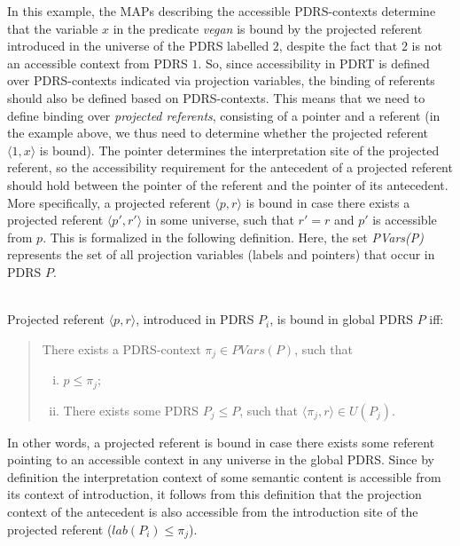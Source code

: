 In this example, the MAPs describing the accessible PDRS-contexts determine
that the variable $x$ in the predicate \textit{vegan} is bound by the
projected referent introduced in the universe of the PDRS labelled $2$,
despite the fact that $2$ is not an accessible context from PDRS $1$.  So,
since accessibility in PDRT is defined over PDRS-contexts indicated via
projection variables, the binding of referents should also be defined based
on PDRS-contexts. This means that we need to define binding over
\textit{projected referents}, consisting of a pointer and a referent (in the
example above, we thus need to determine whether the projected referent
$\langle 1, x\rangle$ is bound). The pointer determines the interpretation
site of the projected referent, so the accessibility requirement for the
antecedent of a projected referent should hold between the pointer of the
referent and the pointer of its antecedent.  More specifically, a projected
referent $\langle p, r \rangle$ is bound in case there exists a projected
referent $\langle p',r'\rangle$ in some universe, such that $r'=r$ and $p'$
is accessible from $p$.  This is formalized in the following definition.
Here, the set \textit{PVars(P)} represents the set of all projection
variables (labels and pointers) that occur in PDRS $P$.

\begin{definition}~\\
Projected referent $\langle p,r\rangle$, introduced in PDRS $P_i$, is bound
in global PDRS $P$ iff:
\begin{quote}
There exists a PDRS-context $\pi_j \in PVars(P)$, such that
\begin{enumerate}[i.]
  \item $p \leq \pi_j$; 
  \item There exists some PDRS $P_j \leq P$, such that 
    $\langle \pi_j,r\rangle \in U(P_j)$.
\end{enumerate}
\end{quote}
\end{definition}

\noindent In other words, a projected referent is bound in case there exists
some referent pointing to an accessible context in any universe in the
global PDRS.  Since by definition the interpretation context of some
semantic content is accessible from its context of introduction, it follows
from this definition that the projection context of the antecedent is also
accessible from the introduction site of the projected referent ($lab(P_i)
\leq \pi_j$). 

